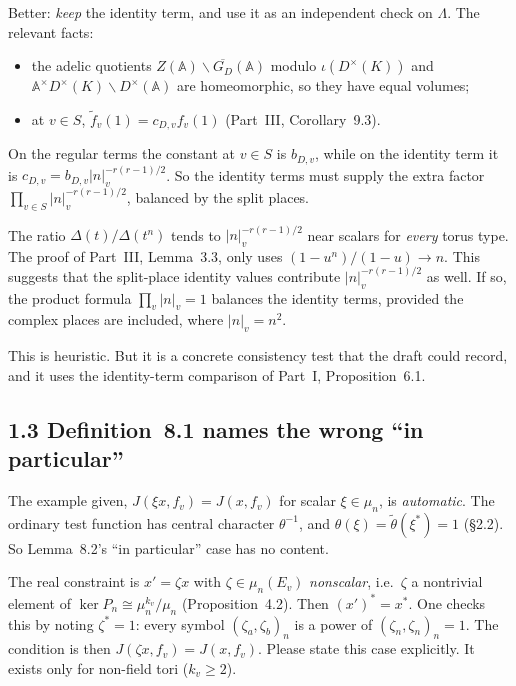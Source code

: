 \documentclass[11pt]{article}
\newcommand{\A}{\mathbb A}
\begin{document}
Better: \emph{keep} the identity term, and use it as an independent
check on $\Lambda$. The relevant facts:
\begin{itemize}
\item the adelic quotients $Z(\A)\backslash\overline{G_D}(\A)$ modulo
$\iota(D^\times(K))$ and $\A^\times D^\times(K)\backslash
D^\times(\A)$ are homeomorphic, so they have equal volumes;
\item at $v\in S$, $\widetilde f_v(1)=c_{D,v}f_v(1)$ (Part~III,
Corollary~9.3).
\end{itemize}
On the regular terms the constant at $v\in S$ is $b_{D,v}$, while on
the identity term it is $c_{D,v}=b_{D,v}|n|_v^{-r(r-1)/2}$. So the
identity terms must supply the extra factor
$\prod_{v\in S}|n|_v^{-r(r-1)/2}$, balanced by the split places.

The ratio $\Delta(t)/\Delta(t^n)$ tends to $|n|_v^{-r(r-1)/2}$ near
scalars for \emph{every} torus type. The proof of Part~III, Lemma~3.3,
only uses $(1-u^n)/(1-u)\to n$. This suggests that the split-place
identity values contribute $|n|_v^{-r(r-1)/2}$ as well. If so, the
product formula $\prod_v|n|_v=1$ balances the identity terms, provided
the complex places are included, where $|n|_v=n^2$.

This is heuristic. But it is a concrete consistency test that the
draft could record, and it uses the identity-term comparison of
Part~I, Proposition~6.1.

\subsection*{1.3 Definition~8.1 names the wrong ``in particular''}
The example given, $J(\xi x,f_v)=J(x,f_v)$ for scalar $\xi\in\mu_n$,
is \emph{automatic}. The ordinary test function has central character
$\theta^{-1}$, and $\theta(\xi)=\tilde\theta(\xi^*)=1$ (\S2.2). So
Lemma~8.2's ``in particular'' case has no content.

The real constraint is $x'=\zeta x$ with $\zeta\in\mu_n(E_v)$
\emph{nonscalar}, i.e.\ $\zeta$ a nontrivial element of
$\ker P_n\cong\mu_n^{k_v}/\mu_n$ (Proposition~4.2). Then
$(x')^*=x^*$. One checks this by noting $\zeta^*=1$: every symbol
$(\zeta_a,\zeta_b)_n$ is a power of $(\zeta_n,\zeta_n)_n=1$. The
condition is then $J(\zeta x,f_v)=J(x,f_v)$. Please state this case
explicitly. It exists only for non-field tori ($k_v\ge2$).
\end{document}
